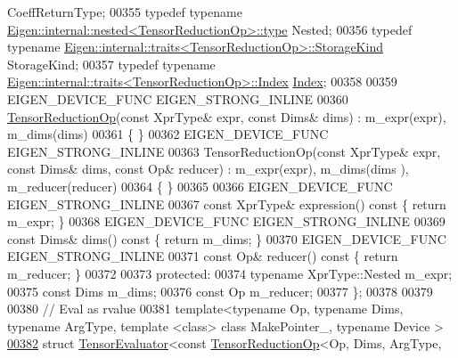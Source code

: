 \begin{DoxyCode}
       CoeffReturnType;
00355     \textcolor{keyword}{typedef} \textcolor{keyword}{typename} \hyperlink{class_eigen_1_1internal_1_1_tensor_lazy_evaluator_writable}{Eigen::internal::nested<TensorReductionOp>::type}
       Nested;
00356     \textcolor{keyword}{typedef} \textcolor{keyword}{typename} \hyperlink{struct_eigen_1_1internal_1_1traits}{Eigen::internal::traits<TensorReductionOp>::StorageKind}
       StorageKind;
00357     \textcolor{keyword}{typedef} \textcolor{keyword}{typename} \hyperlink{struct_eigen_1_1internal_1_1traits}{Eigen::internal::traits<TensorReductionOp>::Index}
       \hyperlink{namespace_eigen_a62e77e0933482dafde8fe197d9a2cfde}{Index};
00358 
00359     EIGEN\_DEVICE\_FUNC EIGEN\_STRONG\_INLINE
00360     \hyperlink{class_eigen_1_1_tensor_reduction_op}{TensorReductionOp}(\textcolor{keyword}{const} XprType& expr, \textcolor{keyword}{const} Dims& dims) : m\_expr(expr), m\_dims(dims)
00361     \{ \}
00362     EIGEN\_DEVICE\_FUNC EIGEN\_STRONG\_INLINE
00363     TensorReductionOp(\textcolor{keyword}{const} XprType& expr, \textcolor{keyword}{const} Dims& dims, \textcolor{keyword}{const} Op& reducer) : m\_expr(expr), m\_dims(dims
      ), m\_reducer(reducer)
00364     \{ \}
00365 
00366     EIGEN\_DEVICE\_FUNC EIGEN\_STRONG\_INLINE
00367     \textcolor{keyword}{const} XprType& expression()\textcolor{keyword}{ const }\{ \textcolor{keywordflow}{return} m\_expr; \}
00368     EIGEN\_DEVICE\_FUNC EIGEN\_STRONG\_INLINE
00369     \textcolor{keyword}{const} Dims& dims()\textcolor{keyword}{ const }\{ \textcolor{keywordflow}{return} m\_dims; \}
00370     EIGEN\_DEVICE\_FUNC EIGEN\_STRONG\_INLINE
00371     \textcolor{keyword}{const} Op& reducer()\textcolor{keyword}{ const }\{ \textcolor{keywordflow}{return} m\_reducer; \}
00372 
00373   \textcolor{keyword}{protected}:
00374     \textcolor{keyword}{typename} XprType::Nested m\_expr;
00375     \textcolor{keyword}{const} Dims m\_dims;
00376     \textcolor{keyword}{const} Op m\_reducer;
00377 \};
00378 
00379 
00380 \textcolor{comment}{// Eval as rvalue}
00381 \textcolor{keyword}{template}<\textcolor{keyword}{typename} Op, \textcolor{keyword}{typename} Dims, \textcolor{keyword}{typename} ArgType, \textcolor{keyword}{template} <\textcolor{keyword}{class}> \textcolor{keyword}{class }MakePointer\_, \textcolor{keyword}{typename} Device
      >
\hyperlink{struct_eigen_1_1_tensor_evaluator_3_01const_01_tensor_reduction_op_3_01_op_00_01_dims_00_01_arg_4fdf2ec1445de4704eb590bc98040dc6}{00382} \textcolor{keyword}{struct }\hyperlink{struct_eigen_1_1_tensor_evaluator}{TensorEvaluator}<const \hyperlink{class_eigen_1_1_tensor_reduction_op}{TensorReductionOp}<Op, Dims, ArgType, 

\end{DoxyCode}
